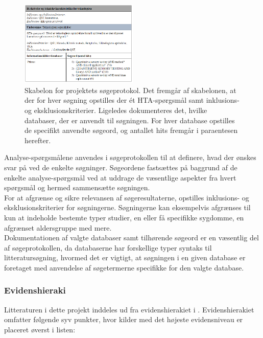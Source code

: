 \begin{figure}[H]
\begin{center}
\includegraphics[width=0.5\textwidth]{figures/cMetode/soegeprotokol}
\end{center}
\caption{Skabelon for projektets søgeprotokol. Det fremgår af skabelonen, at der for hver søgning opstilles der ét HTA-spørgsmål samt inklusions- og eksklusionskriterier. Ligeledes dokumenteres det, hvilke databaser, der er anvendt til søgningen. For hver database opstilles de specifikt anvendte søgeord, og antallet hits fremgår i paraentesen herefter.}
\label{fig:soegeprotokol} 
\end{figure} \vspace{-.25cm}

Analyse-spørgsmålene anvendes i søgeprotokollen til at definere, hvad der ønskes svar på ved de enkelte søgninger. Søgeordene fastsættes på baggrund af de enkelte analyse-spørgsmål ved at uddrage de væsentlige aspekter fra hvert spørgsmål og hermed sammensætte søgningen.\\ %
For at afgrænse og sikre relevansen af søgeresultaterne, opstilles inklusions- og eksklusionskriterier for søgningerne. Søgningerne kan eksempelvis afgrænses til kun at indeholde bestemte typer studier, en eller få specifikke sygdomme, en afgrænset aldersgruppe med mere. \citep{metodehaandbogen} \\
Dokumentationen af valgte databaser samt tilhørende søgeord er en væsentlig del af søgeprotokollen, da databaserne har forskellige typer syntaks til litteratursøgning, hvormed det er vigtigt, at søgningen i en given database er foretaget med anvendelse af søgetermerne specifikke for den valgte database. \citep{metodehaandbogen}

\subsubsection{Evidenshieraki}
Litteraturen i dette projekt inddeles ud fra evidenshierakiet i . Evidenshierakiet omfatter følgende syv punkter, hvor kilder med det højeste evidensniveau er placeret øverst i listen:

